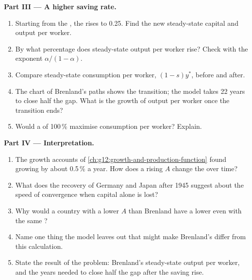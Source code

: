 \begin{problem}
\medskip
\noindent\textbf{Part III --- A higher saving rate.}
\begin{enumerate}[resume]
\item Starting from the , the  rises to 0.25. Find the new steady-state capital and output per worker.
\item By what percentage does steady-state output per worker rise? Check with the exponent $\alpha/(1 - \alpha)$.
\item Compare steady-state consumption per worker, $(1 - s)y^*$, before and after.
\item The chart of Brenland's paths shows the transition; the model takes 22 years to close half the gap. What is the growth of output per worker once the transition ends?
\item Would a  of 100\,\% maximise consumption per worker? Explain.
\end{enumerate}

\medskip
\noindent\textbf{Part IV --- Interpretation.}
\begin{enumerate}[resume]
\item The growth accounts of \cref{ch:g12:growth-and-production-function} found  growing by about 0.5\,\% a year. How does a rising $A$ change the
   over time?
\item What does the recovery of Germany and Japan after 1945 suggest about the speed of convergence when capital alone is lost?
\item Why would a country with a lower $A$ than Brenland have a lower  even with the same ?
\item Name one thing the model leaves out that might make Brenland's  differ from this calculation.
\item State the result of the problem: Brenland's steady-state output per worker, and the years needed to close half the gap after the saving rise.
\end{enumerate}
\end{problem}
